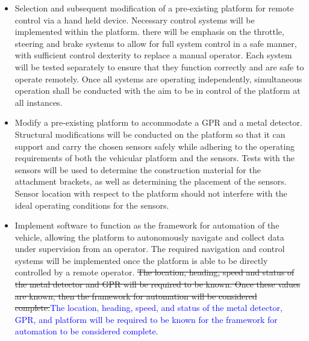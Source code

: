 \documentclass[main.tex]{subfiles}
\begin{document}
\begin{itemize}
\item Selection and subsequent modification of a pre-existing platform for remote control via a hand held device. Necessary control systems will be implemented within the platform. there will be emphasis on the throttle, steering and brake systems to allow for full system control in a safe manner, with sufficient control dexterity to replace a manual operator. Each system will be tested separately to ensure that they function correctly and are safe to operate remotely. Once all systems are operating independently, simultaneous operation shall be conducted with the aim to be in control of the platform at all instances. %

\item Modify a pre-existing platform to accommodate a GPR and a metal detector. Structural modifications will be conducted on the platform so that it can support and carry the chosen sensors safely while adhering to the operating requirements of both the vehicular platform and the sensors. %
Tests with the sensors will be used to determine the construction material for the attachment brackets, as well as determining the placement of the sensors. Sensor location with respect to the platform should not interfere with the ideal operating conditions for the sensors.

\item Implement software to function as the framework for automation of the vehicle, allowing the platform to autonomously navigate and collect data under supervision from an operator. 
The required navigation and control systems will be implemented once the platform is able to be directly controlled by a remote operator. \sout{The location, heading, speed and status of the metal detector and GPR will be required to be known. Once these values are known, then the framework for automation will be considered complete.}\textcolor{blue}{The location, heading, speed, and status of the metal detector, GPR, and platform will be required to be known for the framework for automation to be considered complete.}


\end{itemize}
\end{document}
